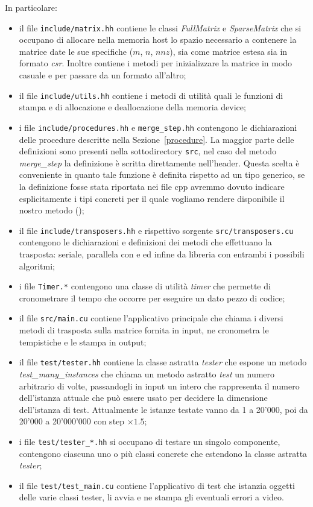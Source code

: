 In particolare:
\begin{itemize}
    \item il file \texttt{include/matrix.hh} contiene le classi \emph{FullMatrix} e \emph{SparseMatrix} che si occupano di allocare nella memoria host lo spazio necessario a contenere la matrice date le sue specifiche ($m$, $n$, $nnz$), sia come matrice estesa sia in formato \emph{csr}. Inoltre contiene i metodi per inizializzare la matrice in modo casuale e per passare da un formato all'altro;
    \item il file \texttt{include/utils.hh} contiene i metodi di utilità quali le funzioni di stampa e di allocazione e deallocazione della memoria device;
    \item i file \texttt{include/procedures.hh} e \texttt{merge\_step.hh} contengono le dichiarazioni delle procedure descritte nella Sezione~\ref{procedure}. La maggior parte delle definizioni sono presenti nella sottodirectory \texttt{src}, nel caso del metodo \emph{merge\_step} la definizione è scritta direttamente nell'header. Questa scelta è conveniente in quanto tale funzione è definita rispetto ad un tipo generico, se la definizione fosse stata riportata nei file cpp avremmo dovuto indicare esplicitamente i tipi concreti per il quale vogliamo rendere disponibile il nostro metodo (\cite{template});
    \item il file \texttt{include/transposers.hh} e rispettivo sorgente \texttt{src/transposers.cu} contengono le dichiarazioni e definizioni dei metodi che effettuano la trasposta: seriale, parallela con \ScanTrans e \MergeTrans ed infine da libreria \cuSPARSE con entrambi i possibili algoritmi;
    \item i file \texttt{Timer.*} contengono una classe di utilità \emph{timer} che permette di cronometrare il tempo che occorre per eseguire un dato pezzo di codice;
    \item il file \texttt{src/main.cu} contiene l'applicativo principale che chiama i diversi metodi di trasposta sulla matrice fornita in input, ne cronometra le tempistiche e le stampa in output;
    \item il file \texttt{test/tester.hh} contiene la classe astratta \emph{tester} che espone un metodo \emph{test\_many\_instances} che chiama un metodo astratto \emph{test} un numero arbitrario di volte, passandogli in input un intero che rappresenta il numero dell'istanza attuale che può essere usato per decidere la dimensione dell'istanza di test. Attualmente le istanze testate vanno da 1 a 20'000, poi da 20'000 a 20'000'000 con step $\times 1.5$; 
    \item i file \texttt{test/tester_*.hh} si occupano di testare un singolo componente, contengono ciascuna uno o più classi concrete che estendono la classe astratta \emph{tester};
    \item il file \texttt{test/test\_main.cu} contiene l'applicativo di test che istanzia oggetti delle varie classi tester, li avvia e ne stampa gli eventuali errori a video.
\end{itemize}
	
